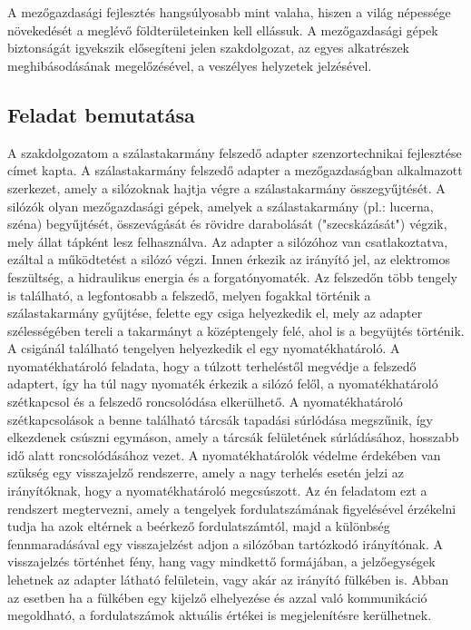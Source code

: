 \chapter{\bevezetes}

A mezőgazdasági fejlesztés hangsúlyosabb mint valaha, hiszen a világ népessége növekedését a meglévő földterületeinken kell ellássuk. A mezőgazdasági gépek biztonságát igyekszik elősegíteni jelen szakdolgozat, az egyes alkatrészek meghibásodásának megelőzésével, a veszélyes helyzetek jelzésével. 

\section{Feladat bemutatása}

A szakdolgozatom a szálastakarmány felszedő adapter szenzortechnikai fejlesztése címet kapta. A szálastakarmány felszedő adapter a mezőgazdaságban alkalmazott szerkezet, amely a silózoknak hajtja végre a szálastakarmány összegyűjtését. A silózók olyan mezőgazdasági gépek, amelyek a szálastakarmány (pl.: lucerna, széna) begyűjtését, összevágását és rövidre darabolását ("szecskázását") végzik, mely állat tápként lesz felhasználva. Az adapter a silózóhoz van csatlakoztatva, ezáltal a működtetést a silózó végzi. Innen érkezik az irányító jel, az elektromos feszültség, a hidraulikus energia és a forgatónyomaték. Az felszedőn több tengely is található, a legfontosabb a felszedő, melyen fogakkal történik a szálastakarmány gyűjtése, felette egy csiga helyezkedik el, mely az adapter szélességében tereli a takarmányt a középtengely felé, ahol is a begyüjtés történik. A csigánál található tengelyen helyezkedik el egy nyomatékhatároló. A nyomatékhatároló feladata, hogy a túlzott terheléstől megvédje a felszedő adaptert, így ha túl nagy nyomaték érkezik a silózó felől, a nyomatékhatároló szétkapcsol és a felszedő roncsolódása elkerülhető. A nyomatékhatároló szétkapcsolások a benne található tárcsák tapadási súrlódása megszűnik, így elkezdenek csúszni egymáson, amely a tárcsák felületének súrládásához, hosszabb idő alatt roncsolódásához vezet. A nyomatékhatárolók védelme érdekében van szükség egy visszajelző rendszerre, amely a nagy terhelés esetén jelzi az irányítóknak, hogy a nyomatékhatároló megcsúszott.
Az én feladatom ezt a rendszert megtervezni, amely a tengelyek fordulatszámának figyelésével érzékelni tudja ha azok eltérnek a beérkező fordulatszámtól, majd a különbség fennmaradásával egy visszajelzést adjon a silózóban tartózkodó irányítónak. A visszajelzés történhet fény, hang vagy mindkettő formájában, a jelzőegységek lehetnek az adapter látható felületein, vagy akár az irányító fülkében is. Abban az esetben ha a fülkében egy kijelző elhelyezése és azzal való kommunikáció megoldható, a fordulatszámok aktuális értékei is megjelenítésre kerülhetnek.

